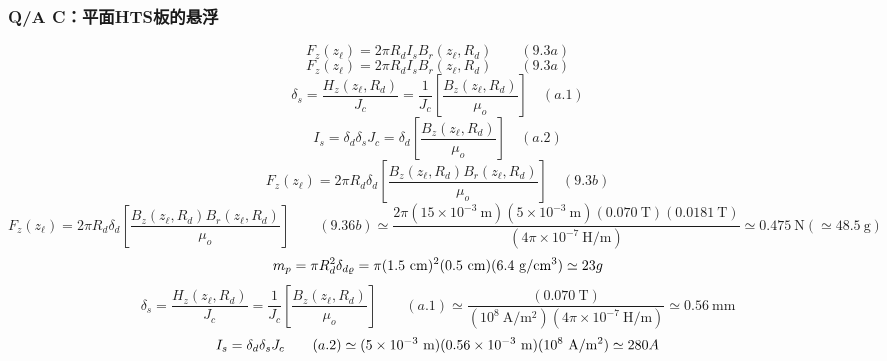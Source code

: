\subsubsection{Q/A C：平面HTS板的悬浮}
\begin{equation}%
F_{z}(z_{\ell})=2\pi R_{d}I_{s}B_{r}(z_{\ell},R_{d})\qquad(9.3a)
\end{equation}
\begin{equation}%
F_{z}(z_{\ell})=2\pi R_{d}I_{s}B_{r}(z_{\ell},R_{d})\qquad(9.3a)
\end{equation}
\begin{equation}%
\delta_{s}=\frac{H_{z}(z_{\ell},R_{d})}{J_{c}}=\frac{1}{J_{c}}[\frac{B_{z}(z_{\ell},R_{d})}{\mu_{o}}]\quad(a.1)
\end{equation}
\begin{equation}%
I_{s}=\delta_{d}\delta_{s}J_{c}=\delta_{d}[\frac{B_{z}(z_{\ell},R_{d})}{\mu_{o}}]\quad(a.2)
\end{equation}
\begin{equation}%
F_{z}(z_{\ell})=2\pi R_{d}\delta_{d}[\frac{B_{z}(z_{\ell},R_{d})B_{r}(z_{\ell},R_{d})}{\mu_{o}}]\quad(9.3b)
\end{equation}
\begin{equation}%
F_{z}(z_{\ell})=2\pi R_{d}\delta_{d}[\frac{B_{z}(z_{\ell},R_{d})B_{r}(z_{\ell},R_{d})}{\mu_{o}}]\qquad(9.36b)
\simeq\frac{2\pi(15\times10^{-3}\ \mathrm{m})(5\times10^{-3}\ \mathrm{m})(0.070\ \mathrm{T})(0.0181\ \mathrm{T})}{(4\pi\times10^{-7}\ \mathrm{H/m})}
\simeq0.475\ \mathrm{N}(\simeq48.5\ \mathrm{g})
\end{equation}
\begin{equation}%
m_{p}=\pi R^{2}_{d}\delta_{d\varrho}\\
=\pi(1.5\ \mathrm{cm})^{2}(0.5\ \mathrm{cm})(6.4\ \mathrm{g/cm^{3}})\simeq23g
\end{equation}
\begin{equation}%
\delta_{s}=\frac{H_{z}(z_{\ell},R_{d})}{J_{c}}=\frac{1}{J_{c}}[\frac{B_{z}(z_{\ell},R_{d})}{\mu_{o}}]\qquad(a.1)
\simeq\frac{(0.070\ \mathrm{T})}{(10^{8}\ \mathrm{A/m^{2}})(4\pi\times10^{-7}\ \mathrm{H/m})}\simeq0.56\ \mathrm{mm}
\end{equation}
\begin{equation}%
I_{s}=\delta_{d}\delta_{s}J_{c}\qquad(a.2)\\
\simeq(5\times10^{-3}\ \mathrm{m})(0.56\times10^{-3}\ \mathrm{m})(10^{8}\ \mathrm{A/m^{2}})\simeq280A
\end{equation}

